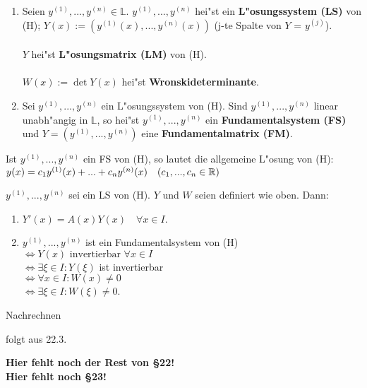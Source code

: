 \documentclass[a4paper,twoside,DIV15,BCOR12mm,chapterprefix=true,headings=twolinechapter]{scrbook}
\begin{document}
\begin{definition}
\begin{enumerate}
\item Seien $y^{(1)}, ..., y^{(n)} \in \mathbb{L}$. $y^{(1)}, ..., y^{(n)}$ hei"st ein \textbf{L"osungssystem (LS)} von (H); $Y(x) := (y^{(1)}(x), ..., y^{(n)}(x))$ (j-te Spalte von $Y$  =  $y^{(j)}$).\\\\
$Y$ hei"st \textbf{L"osungsmatrix (LM)} von (H).\\\\
$W(x) := \det Y(x)$ hei"st \textbf{Wronskideterminante}.\\
\item Sei $y^{(1)}, ..., y^{(n)}$ ein L"osungssystem von (H). Sind $y^{(1)}, ..., y^{(n)}$ linear unabh"angig in $\mathbb{L}$, so hei"st $y^{(1)}, ..., y^{(n)}$ ein \textbf{Fundamentalsystem (FS)} und $Y = (y^{(1)}, ..., y^{(n)})$ eine \textbf{Fundamentalmatrix (FM)}.
\end{enumerate}
Ist $y^{(1)}, ..., y^{(n)}$ ein FS von (H), so lautet die allgemeine L"osung von (H): $y(x) = c_1 y^{(1)}(x) + ... + c_n y^{(n)} (x) \quad (c_1, ..., c_n \in \mathbb{R})$
\end{definition}

\begin{satz}
$y^{(1)}, ..., y^{(n)}$ sei ein LS von (H). $Y$ und $W$ seien definiert wie oben. Dann:\begin{enumerate}
\item $Y'(x) = A(x)Y(x) \quad \forall x \in I$.
\item $y^{(1)}, ..., y^{(n)}$ ist ein Fundamentalsystem von (H)\\ $\iff Y(x) \text{ invertierbar } \forall x \in I$ \\ $\iff \exists \xi \in I: Y(\xi )$ ist invertierbar \\ $\iff \forall x \in I: W(x) \neq 0$ \\ $\iff \exists \xi \in I: W(\xi ) \neq 0$.
\end{enumerate}
\end{satz}

\begin{beweise}
\item Nachrechnen
\item folgt aus 22.3.
\end{beweise}

\textbf{\color{red}Hier fehlt noch der Rest von §22!}\\
\textbf{\color{red}Hier fehlt noch §23!}
\end{document}
